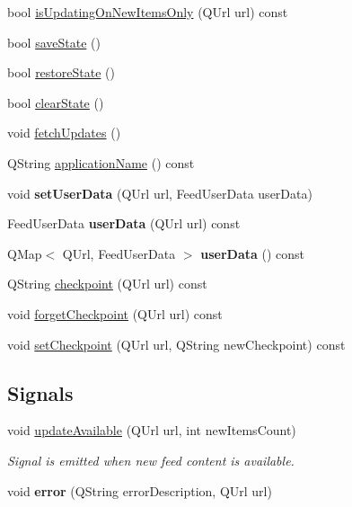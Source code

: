 \begin{DoxyCompactItemize}
\item 
bool \hyperlink{class_r_s_s_manager_a08dc3aa8812b5b22fea4bd64c71fa474}{is\-Updating\-On\-New\-Items\-Only} (Q\-Url url) const 
\item 
bool \hyperlink{class_r_s_s_manager_ab8ad38352998ee4b3d8e257f6a8d7700}{save\-State} ()
\item 
bool \hyperlink{class_r_s_s_manager_ac7471202ae912cc996eab19d047dbef5}{restore\-State} ()
\item 
bool \hyperlink{class_r_s_s_manager_af5b5bee03db89672564cfa53deb86851}{clear\-State} ()
\item 
void \hyperlink{class_r_s_s_manager_aec7c080390df20d8117ad66f47777cae}{fetch\-Updates} ()
\item 
Q\-String \hyperlink{class_r_s_s_manager_afe064ca0fb955f5a5a9874a7a4d273b1}{application\-Name} () const 
\item 
\hypertarget{class_r_s_s_manager_a02a09bc4d458e7bc74926647d71da421}{void {\bfseries set\-User\-Data} (Q\-Url url, Feed\-User\-Data user\-Data)}\label{class_r_s_s_manager_a02a09bc4d458e7bc74926647d71da421}

\item 
\hypertarget{class_r_s_s_manager_a3a9717c96941045888e9b421e49cf3c4}{Feed\-User\-Data {\bfseries user\-Data} (Q\-Url url) const }\label{class_r_s_s_manager_a3a9717c96941045888e9b421e49cf3c4}

\item 
\hypertarget{class_r_s_s_manager_ace43b66270dafdd9c1c54cba2a449bad}{Q\-Map$<$ Q\-Url, Feed\-User\-Data $>$ {\bfseries user\-Data} () const }\label{class_r_s_s_manager_ace43b66270dafdd9c1c54cba2a449bad}

\item 
Q\-String \hyperlink{class_r_s_s_manager_a3142e13c74b94efe76e95210a468283c}{checkpoint} (Q\-Url url) const 
\item 
void \hyperlink{class_r_s_s_manager_a633ad2e13e05855fe4b9be177807c337}{forget\-Checkpoint} (Q\-Url url) const 
\item 
void \hyperlink{class_r_s_s_manager_a5cbe9b09302da0fabed486f8bd76225b}{set\-Checkpoint} (Q\-Url url, Q\-String new\-Checkpoint) const 
\end{DoxyCompactItemize}
\subsection*{Signals}
\begin{DoxyCompactItemize}
\item 
void \hyperlink{class_r_s_s_manager_a465f7c816a89f3e2d19c64a07b75ac5b}{update\-Available} (Q\-Url url, int new\-Items\-Count)
\begin{DoxyCompactList}\small\item\em Signal is emitted when new feed content is available. \end{DoxyCompactList}\item 
\hypertarget{class_r_s_s_manager_ad53613dd4020902baec988b79ec17eb2}{void {\bfseries error} (Q\-String error\-Description, Q\-Url url)}\label{class_r_s_s_manager_ad53613dd4020902baec988b79ec17eb2}

\end{DoxyCompactItemize}
